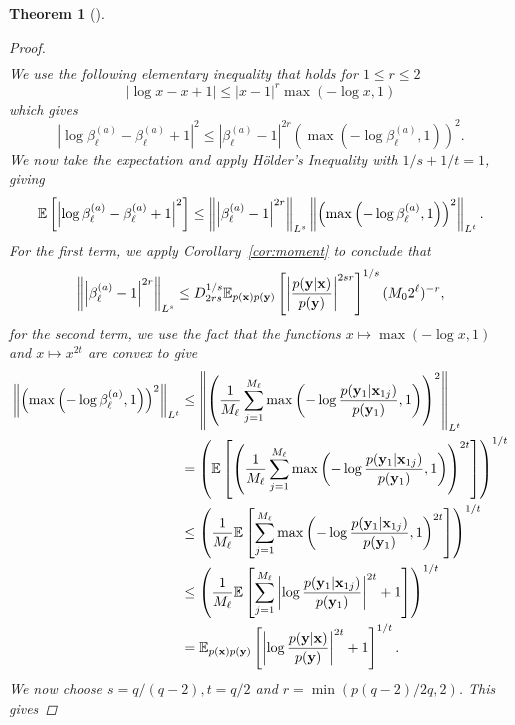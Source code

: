 \documentclass[a4paper, 10pt]{report}
\theoremstyle{plain}
\newtheorem{theorem}{Theorem}[chapter]
\begin{document}
\begin{theorem}[\citet{goda2020multilevel}]
\begin{proof}
\begin{align}
			\end{align}
			We use the following elementary inequality that holds for $1\le r \le 2$
			\begin{equation}
			|\log x - x + 1|\le |x-1|^r\max(-\log x, 1)
			\end{equation}
			which gives
			\begin{equation}
			\left|\log \beta_\ell^{(a)}-\beta_\ell^{(a)} + 1\right|^2 \le \left|\beta_\ell^{(a)}-1\right|^{2r}\left(\max\left(-\log \beta_\ell^{(a)}, 1\right)\right)^2.
			\end{equation}
			We now take the expectation and apply H\"{o}lder's Inequality with $1/s + 1/t =1$, giving
			\begin{equation}
			\mathbb{E}\left[\left|\log \beta_\ell^{(a)}-\beta_\ell^{(a)} + 1\right|^2\right] \le \left\|\left|\beta_\ell^{(a)}-1\right|^{2r}\right\|_{L^s} \left\|\left(\max\left(-\log \beta_\ell^{(a)}, 1\right)\right)^2\right\|_{L^t}.
			\end{equation}
			For the first term, we apply Corollary~\ref{cor:moment} to conclude that
			\begin{equation}
			\left\|\left|\beta_\ell^{(a)}-1\right|^{2r}\right\|_{L^s} \le D_{2rs}^{1/s}\mathbb{E}_{p({\mathbf{x}})p({\mathbf{y}})}\left[\left|\frac{p({\mathbf{y}}|{\mathbf{x}})}{p({\mathbf{y}})} \right|^{2sr}\right]^{1/s} (M_02^\ell)^{-r},
			\end{equation}
			for the second term, we use the fact that the functions $x\mapsto \max(-\log x, 1)$ and $x\mapsto x^{2t}$ are convex to give
			\begin{align}
			\left\|\left(\max\left(-\log \beta_\ell^{(a)}, 1\right)\right)^2\right\|_{L^t} &\le \left\|\left(\frac{1}{M_{\ell}} \sum_{j=1}^{M_{\ell}} \max\left(-\log\frac{p({\mathbf{y}}_1|{\mathbf{x}}_{1j})}{p({\mathbf{y}}_1)},1\right)\right)^2\right\|_{L^t} \\
			&= \left( \mathbb{E}\left[\left(\frac{1}{M_{\ell}} \sum_{j=1}^{M_{\ell}} \max\left(-\log\frac{p({\mathbf{y}}_1|{\mathbf{x}}_{1j})}{p({\mathbf{y}}_1)},1\right)\right)^{2t}\right] \right)^{1/t} \\
			&\le \left(\frac{1}{M_{\ell}} \mathbb{E}\left[ \sum_{j=1}^{M_{\ell}} \max\left(-\log\frac{p({\mathbf{y}}_1|{\mathbf{x}}_{1j})}{p({\mathbf{y}}_1)},1\right)^{2t}\right] \right)^{1/t} \\
			&\le \left(\frac{1}{M_{\ell}} \mathbb{E}\left[ \sum_{j=1}^{M_{\ell}} \left|\log\frac{p({\mathbf{y}}_1|{\mathbf{x}}_{1j})}{p({\mathbf{y}}_1)}\right|^{2t} + 1\right] \right)^{1/t} \\
			&=  \mathbb{E}_{p({\mathbf{x}})p({\mathbf{y}})}\left[ \left|\log\frac{p({\mathbf{y}}|{\mathbf{x}})}{p({\mathbf{y}})}\right|^{2t} + 1\right]^{1/t}.
			\end{align}
			We now choose $s = q/(q-2), t=q/2$ and $r = \min(p(q-2)/2q, 2)$. This gives

\end{proof}
\end{theorem}
\end{document}
